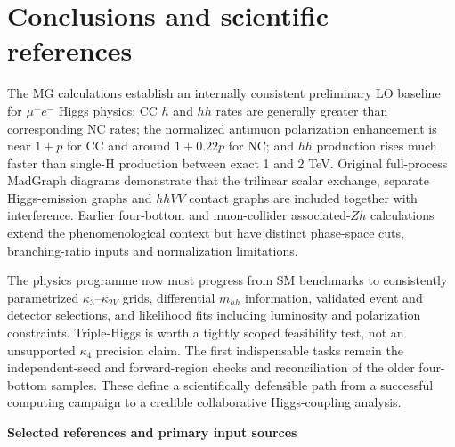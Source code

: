 \documentclass[12pt,a4paper]{article}
\newcommand{\newnote}{\clearpage}
\begin{document}
\newnote


\section{Conclusions and scientific references}

The MG calculations establish an internally consistent preliminary LO baseline for $\mu^+e^-$ Higgs physics: CC $h$ and $hh$ rates are generally greater than corresponding NC rates; the normalized antimuon polarization enhancement is near $1+p$ for CC and around $1+0.22p$ for NC; and $hh$ production rises much faster than single-H production between exact 1 and 2 TeV. Original full-process MadGraph diagrams demonstrate that the trilinear scalar exchange, separate Higgs-emission graphs and $hhVV$ contact graphs are included together with interference. Earlier four-bottom and muon-collider associated-$Zh$ calculations extend the phenomenological context but have distinct phase-space cuts, branching-ratio inputs and normalization limitations.

The physics programme now must progress from SM benchmarks to consistently parametrized $\kappa_3$--$\kappa_{2V}$ grids, differential $m_{hh}$ information, validated event and detector selections, and likelihood fits including luminosity and polarization constraints. Triple-Higgs is worth a tightly scoped feasibility test, not an unsupported $\kappa_4$ precision claim. The first indispensable tasks remain the independent-seed and forward-region checks and reconciliation of the older four-bottom samples. These define a scientifically defensible path from a successful computing campaign to a credible collaborative Higgs-coupling analysis.




\vspace{2pt}\noindent\textbf{Selected references and primary input sources}
\end{document}
